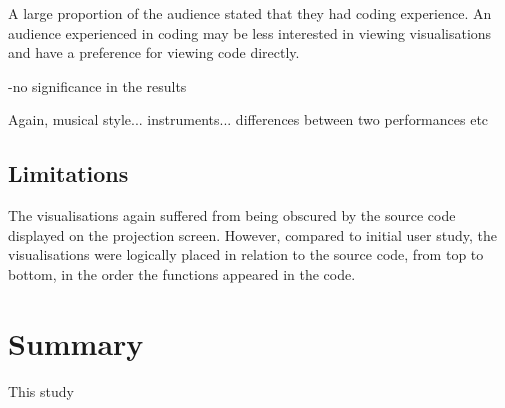A large proportion of the audience stated that they had coding experience. An audience experienced in coding may be less interested in viewing visualisations and have a preference for viewing code directly.

-no significance in the results

Again, musical style... instruments... differences between two performances etc

\more

\subsection{Limitations}

The visualisations again suffered from being obscured by the source code displayed on the projection screen. However, compared to initial user study, the visualisations were logically placed in relation to the source code, from top to bottom, in the order the functions appeared in the code.

\section{Summary}

This study 
\more








